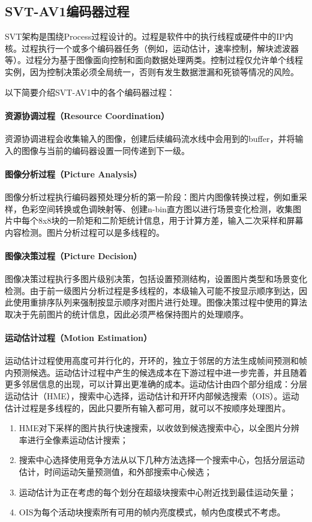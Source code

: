 \subsection{SVT-AV1编码器过程}
  SVT架构是围绕Process过程设计的\cite{EncoderDesignSVTAV1}。过程是软件中的执行线程或硬件中的IP内核。过程执行一个或多个编码器任务（例如，运动估计，速率控制，解块滤波器等）。过程分为基于图像面向控制和面向数据处理两类。控制过程仅允许单个线程实例，因为控制决策必须全局统一，否则有发生数据泄漏和死锁等情况的风险。

  以下简要介绍SVT-AV1中的各个编码器过程：
  \paragraph{资源协调过程（Resource Coordination）} 资源协调进程会收集输入的图像，创建后续编码流水线中会用到的buffer，并将输入的图像与当前的编码器设置一同传递到下一级。

  \paragraph{图像分析过程（Picture Analysis）} 图像分析过程执行编码器预处理分析的第一阶段：图片内图像转换过程，例如重采样，色彩空间转换或色调映射等、创建n-bin直方图以进行场景变化检测，收集图片中每个8x8块的一阶矩和二阶矩统计信息，用于计算方差，输入二次采样和屏幕内容检测。图片分析过程可以是多线程的。

  \paragraph{图像决策过程（Picture Decision）} 图像决策过程执行多图片级别决策，包括设置预测结构，设置图片类型和场景变化检测。由于前一级图片分析过程是多线程的，本级输入可能不按显示顺序到达，因此使用重排序队列来强制按显示顺序对图片进行处理。图像决策过程中使用的算法取决于先前图片的统计信息，因此必须严格保持图片的处理顺序。

  \paragraph{运动估计过程（Motion Estimation）} 运动估计过程使用高度可并行化的，开环的，独立于邻居的方法生成帧间预测和帧内预测候选。运动估计过程中产生的候选成本在下游过程中进一步完善，并且随着更多邻居信息的出现，可以计算出更准确的成本。运动估计由四个部分组成：分层运动估计（HME），搜索中心选择，运动估计和开环内部候选搜索（OIS）。运动估计过程是多线程的，因此只要所有输入都可用，就可以不按顺序处理图片。
  \begin{enumerate} [label=\arabic*)]
    \item HME对下采样的图片执行快速搜索，以收敛到候选搜索中心，以全图片分辨率进行全像素运动估计搜索；
    \item 搜索中心选择使用竞争方法从以下几种方法选择一个搜索中心，包括分层运动估计，时间运动矢量预测值，和外部搜索中心候选；
    \item 运动估计为正在考虑的每个划分在超级块搜索中心附近找到最佳运动矢量；
    \item OIS为每个活动块搜索所有可用的帧内亮度模式，帧内色度模式不考虑。
  \end{enumerate}

